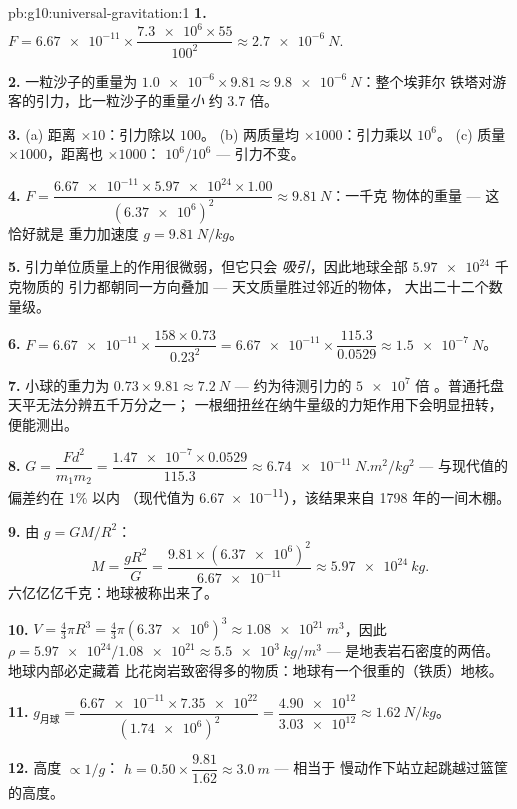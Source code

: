 \begin{solution}{pb:g10:universal-gravitation:1}
\textbf{1.} $F = \num{6.67e-11} \times
\dfrac{\num{7.3e6} \times 55}{100^2} \approx \qty{2.7e-6}{N}$.

\textbf{2.} 一粒沙子的重量为
$\num{1.0e-6} \times 9.81 \approx \qty{9.8e-6}{N}$：整个埃菲尔
铁塔对游客的引力，比一粒沙子的重量\emph{小}
约 $3.7$ 倍。

\textbf{3.} (a) 距离 $\times 10$：引力除以 $100$。
(b) 两质量均 $\times 1000$：引力乘以 $10^6$。
(c) 质量 $\times 1000$，距离也 $\times 1000$：
$10^6 / 10^6$ --- 引力不变。

\textbf{4.} $F = \dfrac{\num{6.67e-11} \times \num{5.97e24} \times
1.00}{(\num{6.37e6})^2} \approx \qty{9.81}{N}$：一千克
物体的重量 --- 这恰好就是
重力加速度 $g = \qty{9.81}{N/kg}$。

\textbf{5.} 引力单位质量上的作用很微弱，但它只会
\emph{吸引}，因此地球全部 $\num{5.97e24}$ 千克物质的
引力都朝同一方向叠加 --- 天文质量胜过邻近的物体，
大出二十二个数量级。

\textbf{6.} $F = \num{6.67e-11} \times \dfrac{158 \times 0.73}{0.23^2}
= \num{6.67e-11} \times \dfrac{115.3}{0.0529}
\approx \qty{1.5e-7}{N}$。

\textbf{7.} 小球的重力为
$0.73 \times 9.81 \approx \qty{7.2}{N}$ --- 约为待测引力的 $\num{5e7}$ 倍
。普通托盘天平无法分辨五千万分之一；
一根细扭丝在纳牛量级的力矩作用下会明显扭转，
便能测出。

\textbf{8.} $G = \dfrac{F d^2}{m_1 m_2}
= \dfrac{\num{1.47e-7} \times 0.0529}{115.3}
\approx \qty{6.74e-11}{N.m^2/kg^2}$ --- 与现代值的偏差约在 $1\%$ 以内
（现代值为 \num{6.67e-11}），该结果来自 1798 年的一间木棚。

\textbf{9.} 由 $g = G M / R^2$：
\[
M = \frac{g R^2}{G}
= \frac{9.81 \times (\num{6.37e6})^2}{\num{6.67e-11}}
\approx \qty{5.97e24}{kg}.
\]
六亿亿亿千克：地球被称出来了。

\textbf{10.} $V = \frac43 \pi R^3 = \frac43 \pi
(\num{6.37e6})^3 \approx \qty{1.08e21}{m^3}$，因此
$\rho = \num{5.97e24}/\num{1.08e21} \approx \qty{5.5e3}{kg/m^3}$ ---
是地表岩石密度的两倍。地球内部必定藏着
比花岗岩致密得多的物质：地球有一个很重的（铁质）地核。

\textbf{11.} $g_{\text{月球}} = \dfrac{\num{6.67e-11} \times
\num{7.35e22}}{(\num{1.74e6})^2} = \dfrac{\num{4.90e12}}
{\num{3.03e12}} \approx \qty{1.62}{N/kg}$。

\textbf{12.} 高度 $\propto 1/g$：
$h = 0.50 \times \dfrac{9.81}{1.62} \approx \qty{3.0}{m}$ --- 相当于
慢动作下站立起跳越过篮筐的高度。


\end{solution}
